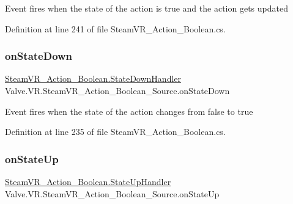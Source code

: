 Event fires when the state of the action is true and the action gets updated 



Definition at line 241 of file Steam\+V\+R\+\_\+\+Action\+\_\+\+Boolean.\+cs.

\mbox{\label{class_valve_1_1_v_r_1_1_steam_v_r___action___boolean___source_a047594426551baeff37ca81d6751ad69}} 
\subsubsection{\texorpdfstring{onStateDown}{onStateDown}}
{\footnotesize\ttfamily \mbox{\hyperlink{class_valve_1_1_v_r_1_1_steam_v_r___action___boolean_a529f46e4f0459edb2641bbb382d10614}{Steam\+V\+R\+\_\+\+Action\+\_\+\+Boolean.\+State\+Down\+Handler}} Valve.\+V\+R.\+Steam\+V\+R\+\_\+\+Action\+\_\+\+Boolean\+\_\+\+Source.\+on\+State\+Down}



Event fires when the state of the action changes from false to true 



Definition at line 235 of file Steam\+V\+R\+\_\+\+Action\+\_\+\+Boolean.\+cs.

\mbox{\label{class_valve_1_1_v_r_1_1_steam_v_r___action___boolean___source_a1b52d5a2bfc5a5f364cd97827b2dd1dc}} 
\subsubsection{\texorpdfstring{onStateUp}{onStateUp}}
{\footnotesize\ttfamily \mbox{\hyperlink{class_valve_1_1_v_r_1_1_steam_v_r___action___boolean_a87ebada25dac6016557c3b81e6324b90}{Steam\+V\+R\+\_\+\+Action\+\_\+\+Boolean.\+State\+Up\+Handler}} Valve.\+V\+R.\+Steam\+V\+R\+\_\+\+Action\+\_\+\+Boolean\+\_\+\+Source.\+on\+State\+Up}



